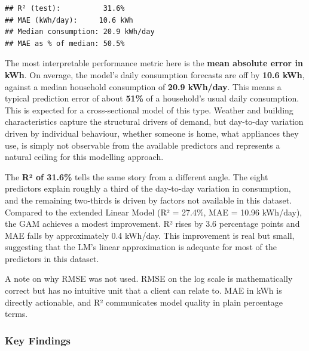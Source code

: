 \documentclass[
]{article}
\begin{document}
\begin{verbatim}
## R² (test):          31.6%
## MAE (kWh/day):     10.6 kWh
## Median consumption: 20.9 kWh/day
## MAE as % of median: 50.5%
\end{verbatim}

The most interpretable performance metric here is the \textbf{mean
absolute error in kWh}. On average, the model's daily consumption
forecasts are off by \textbf{10.6 kWh}, against a median household
consumption of \textbf{20.9 kWh/day}. This means a typical prediction
error of about \textbf{51\%} of a household's usual daily consumption.
This is expected for a cross-sectional model of this type. Weather and
building characteristics capture the structural drivers of demand, but
day-to-day variation driven by individual behaviour, whether someone is
home, what appliances they use, is simply not observable from the
available predictors and represents a natural ceiling for this modelling
approach.

The \textbf{R² of 31.6\%} tells the same story from a different angle.
The eight predictors explain roughly a third of the day-to-day variation
in consumption, and the remaining two-thirds is driven by factors not
available in this dataset. Compared to the extended Linear Model (R² =
27.4\%, MAE = 10.96 kWh/day), the GAM achieves a modest improvement. R²
rises by 3.6 percentage points and MAE falls by approximately 0.4
kWh/day. This improvement is real but small, suggesting that the LM's
linear approximation is adequate for most of the predictors in this
dataset.

A note on why RMSE was not used. RMSE on the log scale is mathematically
correct but has no intuitive unit that a client can relate to. MAE in
kWh is directly actionable, and R² communicates model quality in plain
percentage terms.

\subsubsection{Key Findings}\label{key-findings-2}
\end{document}
